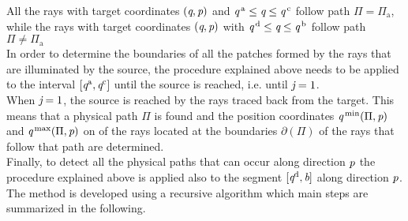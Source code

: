All the rays with target coordinates $(\textit{q}, \textit{p})$ and $\textit{q}^{\,\textrm{a}}\leq\textit{q}\leq\textit{q}^{\,\textrm{c}}$ follow path $\Pi = \Pi_{\textrm{a}}$, while the rays with target coordinates $(\textit{q}, \textit{p})$ with $\textit{q}^{\,\textrm{d}}\leq\textit{q}\leq\textit{q}^{\,\textrm{b}}$ follow path $\Pi \neq \Pi_{\textrm{a}}$
\\ \indent In order to determine the boundaries of all the patches formed by the rays that are illuminated by the source, the procedure explained above needs to be applied to the interval 
$[\textit{q}^{\textrm{a}},\textit{q}^{\textrm{c}}]$ until the source is reached, i.e. until $\textit{j}=1$. 
\\ \indent
When $\textit{j}=1$, the source is reached by the rays traced back from the target. This means that a physical path $\Pi$ is found and the position coordinates $\textit{q}^{\textrm{\,min}}(\Pi, \textit{p})$ and $\textit{q}^{\textrm{\,max}}(\Pi, \textit{p})$ on  of the rays located at the boundaries $\partial$$(\Pi)$ of the rays that follow that path are determined. \\ \indent 
Finally, to detect all the physical paths that can occur along direction $\textit{p}$ the procedure explained above is applied also to the segment $[\textit{q}^{\textrm{d}}, \textit{\textrm{b}}]$ along direction $\textit{p}$. 
The method is developed using a recursive algorithm which main steps are summarized in the following.
